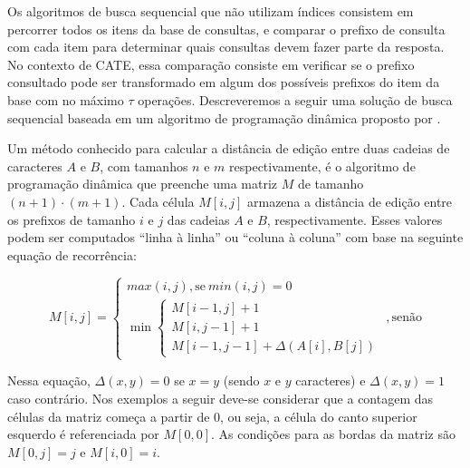 Os algoritmos de busca sequencial que não utilizam índices consistem em percorrer todos os itens da base de consultas, e comparar o prefixo de consulta com cada item para determinar quais consultas devem fazer parte da resposta. No contexto de CATE, essa comparação consiste em verificar se o prefixo consultado pode ser transformado em algum dos possíveis prefixos do item da base com no máximo $\tau$ operações. Descreveremos a seguir uma solução de busca sequencial baseada em um algoritmo de programação dinâmica proposto por \cite{levenshtein1966binary}. 

Um método conhecido para calcular a distância de edição entre duas cadeias de caracteres $A$ e $B$, com tamanhos $n$ e $m$ respectivamente, é o algoritmo de programação dinâmica que preenche uma matriz $M$ de tamanho $(n + 1) \cdot (m + 1)$. Cada célula $M[i,j]$ armazena a distância de edição entre os prefixos de tamanho $i$ e $j$ das cadeias $A$ e $B$, respectivamente. Esses valores podem ser computados ``linha à linha'' ou ``coluna à coluna'' com base na seguinte equação de recorrência:


\[ 
M[i,j] =
        \begin{cases}
        max(i, j), \text{se}\ min(i, j) = 0 \\
         \min
         \begin{cases}
         M[i - 1, j]  + 1 \\ 
         M[i, j - 1]  + 1 \\ 
         M[i - 1, j - 1] + \Delta(A[i], B[j]) \end{cases}
         \end{cases}, \text{senão}
\]

Nessa equação, $\Delta(x,y) = 0$ se $x = y$ (sendo $x$ e $y$ caracteres) e $\Delta(x,y) = 1$ caso contrário. Nos exemplos a seguir deve-se considerar que a contagem das células da matriz começa a partir de $0$, ou seja, a célula do canto superior esquerdo é referenciada por $M[0,0]$. As condições para as bordas da matriz são $M[0, j] = j$ e $M[i, 0] = i$. 


